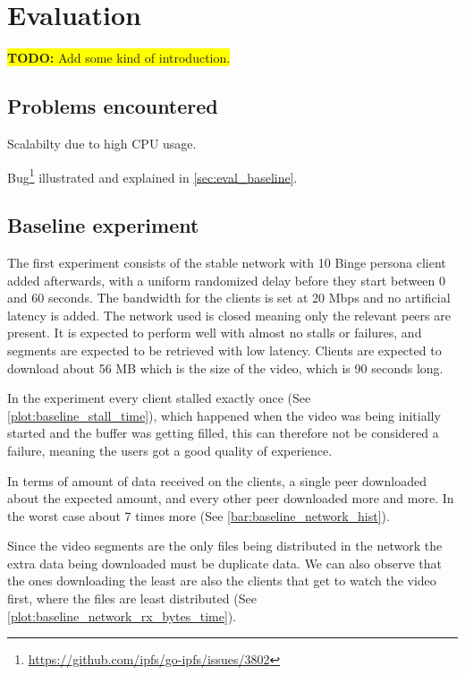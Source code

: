\chapter{Evaluation}
\label{cha:evaluation}

\colorbox{yellow}{\textbf{TODO:} Add some kind of introduction.}

\section{Problems encountered}
Scalabilty due to high CPU usage.

Bug\footnote{\url{https://github.com/ipfs/go-ipfs/issues/3802}} illustrated and explained in \autoref{sec:eval_baseline}.


\section{Baseline experiment}
\label{sec:eval_baseline}
The first experiment consists of the stable network with 10 Binge persona client added afterwards, with a uniform randomized delay before they start between 0 and 60 seconds. The bandwidth for the clients is set at 20 \ac{Mbps} and no artificial latency is added. The network used is closed meaning only the relevant peers are present. It is expected to perform well with almost no stalls or failures, and segments are expected to be retrieved with low latency. Clients are expected to download about 56 \ac{MB} which is the size of the video, which is 90 seconds long.

In the experiment every client stalled exactly once (See \autoref{plot:baseline_stall_time}), which happened when the video was being initially started and the buffer was getting filled, this can therefore not be considered a failure, meaning the users got a good quality of experience.



In terms of amount of data received on the clients, a single peer downloaded about the expected amount, and every other peer downloaded more and more. In the worst case about 7 times more (See \autoref{bar:baseline_network_hist}).



Since the video segments are the only files being distributed in the network the extra data being downloaded must be duplicate data. We can also observe that the ones downloading the least are also the clients that get to watch the video first, where the files are least distributed (See \autoref{plot:baseline_network_rx_bytes_time}).

